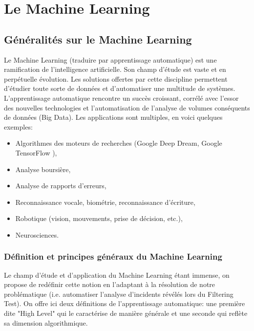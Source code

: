 \chapter{ Le  Machine Learning}
\label{Le Machine Learning}
\thispagestyle{fancy}




\section{Généralités sur le Machine Learning}
\label{Le Machine Learning: Généralités sur le Machine Learning}
Le Machine Learning (traduire par apprentissage automatique) est une ramification de l'intelligence artificielle. Son champ d'étude est vaste et en perpétuelle évolution. Les solutions offertes par cette discipline permettent d'étudier toute sorte de données et d'automatiser une multitude de systèmes. L'apprentissage automatique rencontre un succès croissant, corrélé avec l'essor des nouvelles technologies et l'automatisation de l'analyse de volumes conséquents de données (Big Data). Les applications sont multiples, en voici quelques exemples:  

\begin{itemize}
	\item Algorithmes des moteurs de recherches (Google Deep Dream\cite{DeepDream}, Google TensorFlow \cite{TensorFlow}),
	\item Analyse boursière,
	\item Analyse de rapports d'erreurs,
	\item Reconnaissance vocale, biométrie, reconnaissance d'écriture,
	\item Robotique (vision, mouvements, prise de décision, etc.),
	\item Neurosciences.
\end{itemize}



\subsection{Définition et principes généraux du Machine Learning}
\label{Le Machine Learning: Généralités sur le Machine Learning: Définition et principe général}
Le champ d'étude et d'application du Machine Learning étant immense, on propose de redéfinir cette notion en l'adaptant à la résolution de notre problématique (i.e. automatiser l'analyse d'incidents révélés lors du Filtering Test).
On offre ici deux définitions de l'apprentissage automatique: une première dite "High Level" qui le caractérise de manière générale et une seconde qui reflète sa dimension algorithmique. 

